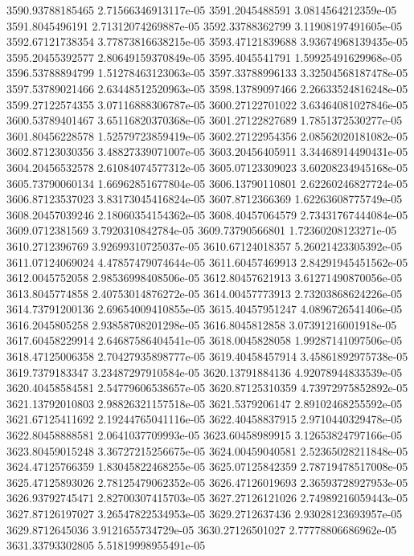 {3590.93788185465 2.71566346913117e-05
3591.2045488591 3.0814564212359e-05
3591.8045496191 2.71312074269887e-05
3592.33788362799 3.11908197491605e-05
3592.67121738354 3.77873816638215e-05
3593.47121839688 3.93674968139435e-05
3595.20455392577 2.80649159370849e-05
3595.4045541791 1.59925491629968e-05
3596.53788894799 1.51278463123063e-05
3597.33788996133 3.32504568187478e-05
3597.53789021466 2.63448512520963e-05
3598.13789097466 2.26633524816248e-05
3599.27122574355 3.07116888306787e-05
3600.27122701022 3.63464081027846e-05
3600.53789401467 3.65116820370368e-05
3601.27122827689 1.7851372530277e-05
3601.80456228578 1.52579723859419e-05
3602.27122954356 2.08562020181082e-05
3602.87123030356 3.48827339071007e-05
3603.20456405911 3.34468914490431e-05
3604.20456532578 2.61084074577312e-05
3605.07123309023 3.60208234945168e-05
3605.73790060134 1.66962851677804e-05
3606.13790110801 2.62260246827724e-05
3606.87123537023 3.83173045416824e-05
3607.8712366369 1.62263608775749e-05
3608.20457039246 2.18060354154362e-05
3608.40457064579 2.73431767444084e-05
3609.0712381569 3.7920310842784e-05
3609.73790566801 1.72360208123271e-05
3610.2712396769 3.92699310725037e-05
3610.67124018357 5.26021423305392e-05
3611.07124069024 4.47857479074644e-05
3611.60457469913 2.84291945451562e-05
3612.0045752058 2.98536998408506e-05
3612.80457621913 3.61271490870056e-05
3613.8045774858 2.40753014876272e-05
3614.00457773913 2.73203868624226e-05
3614.73791200136 2.69654009410855e-05
3615.40457951247 4.0896726541406e-05
3616.2045805258 2.93858708201298e-05
3616.8045812858 3.07391216001918e-05
3617.60458229914 2.64687586404541e-05
3618.0045828058 1.99287141097506e-05
3618.47125006358 2.70427935898777e-05
3619.40458457914 3.45861892975738e-05
3619.7379183347 3.23487297910584e-05
3620.13791884136 4.92078944833539e-05
3620.40458584581 2.54779606538657e-05
3620.87125310359 4.73972975852892e-05
3621.13792010803 2.98826321157518e-05
3621.5379206147 2.89102468255592e-05
3621.67125411692 2.19244765041116e-05
3622.40458837915 2.9710440329478e-05
3622.80458888581 2.0641037709993e-05
3623.60458989915 3.12653824797166e-05
3623.80459015248 3.36727215256675e-05
3624.00459040581 2.52365028211848e-05
3624.47125766359 1.83045822468255e-05
3625.07125842359 2.78719478517008e-05
3625.47125893026 2.78125479062352e-05
3626.47126019693 2.36593728927953e-05
3626.93792745471 2.82700307415703e-05
3627.27126121026 2.74989216059443e-05
3627.87126197027 3.26547822534953e-05
3629.2712637436 2.93028123693957e-05
3629.8712645036 3.9121655734729e-05
3630.27126501027 2.77778806686962e-05
3631.33793302805 5.51819998955491e-05
}
